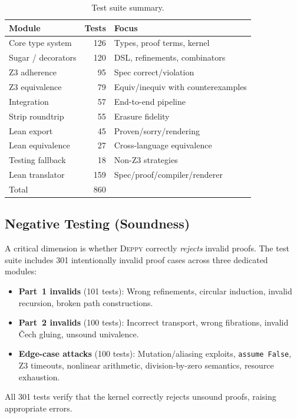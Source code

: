 \documentclass[acmsmall,nonacm,screen]{acmart}
\newcommand{\deppy}{\textsc{Deppy}}
\begin{document}
\begin{table}[t]
\caption{Test suite summary.}
\label{tab:tests}
\centering\small
\begin{tabular}{@{}lrl@{}}
\toprule
Module & Tests & Focus \\
\midrule
Core type system & 126 & Types, proof terms, kernel \\
Sugar / decorators & 120 & DSL, refinements, combinators \\
Z3 adherence & 95 & Spec correct/violation \\
Z3 equivalence & 79 & Equiv/inequiv with counterexamples \\
Integration & 57 & End-to-end pipeline \\
Strip roundtrip & 55 & Erasure fidelity \\
Lean export & 45 & Proven/sorry/rendering \\
Lean equivalence & 27 & Cross-language equivalence \\
Testing fallback & 18 & Non-Z3 strategies \\
Lean translator & 159 & Spec/proof/compiler/renderer \\
\midrule
Total & 860 & \\
\bottomrule
\end{tabular}
\end{table}

\subsection{Negative Testing (Soundness)}

A critical dimension is whether \deppy{} correctly \emph{rejects}
invalid proofs.  The test suite includes 301 intentionally invalid
proof cases across three dedicated modules:

\begin{itemize}
\item \textbf{Part~1 invalids} (101 tests): Wrong refinements,
  circular induction, invalid recursion, broken path constructions.
\item \textbf{Part~2 invalids} (100 tests): Incorrect transport,
  wrong fibrations, invalid \v{C}ech gluing, unsound univalence.
\item \textbf{Edge-case attacks} (100 tests): Mutation/aliasing
  exploits, \texttt{assume False}, Z3 timeouts, nonlinear arithmetic,
  division-by-zero semantics, resource exhaustion.
\end{itemize}

All 301 tests verify that the kernel correctly rejects unsound proofs,
raising appropriate errors.
\end{document}
